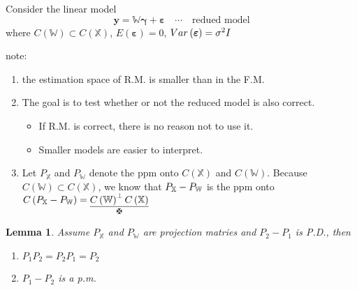 \documentclass{article}
\newtheorem{lemma}[theorem]{Lemma}
\begin{document}
\bigskip

Consider the linear model%
\begin{equation*}
\boldsymbol{y}=\mathbb{W}\boldsymbol{\gamma }+\boldsymbol{\varepsilon \quad }%
\cdots \boldsymbol{\quad }\text{redued model}
\end{equation*}%
where $C\left( \mathbb{W}\right) \subset C\left( \mathbb{X}\right) $, $%
E\left( \boldsymbol{\varepsilon }\right) =0$, $Var\left( \boldsymbol{%
\varepsilon }\right) =\sigma ^{2}I$

\bigskip

note:

\begin{enumerate}
\item the estimation space of R.M. is smaller than in the F.M.

\item The goal is to test whether or not the reduced model is also correct.

\begin{itemize}
\item If R.M. is correct, there is no reason not to use it.

\item Smaller models are easier to interpret.
\end{itemize}

\item Let $P_{\mathbb{X}}$ and $P_{\mathbb{W}}$ denote the ppm onto $C\left( 
\mathbb{X}\right) $ and $C\left( \mathbb{W}\right) $. Because $C\left( 
\mathbb{W}\right) \subset C\left( \mathbb{X}\right) $, we know that $P_{%
\mathbb{X}}-P_{\mathbb{W}}$ is the ppm onto $C\left( P_{\mathbb{X}}-P_{%
\mathbb{W}}\right) =\underset{\maltese }{\underline{C\left( \mathbb{W}%
\right) ^{\perp }C\left( \mathbb{X}\right) }}$
\end{enumerate}

\bigskip

\begin{lemma}
Assume $P_{\mathbb{X}}$ and $P_{\mathbb{W}}$ are projection matries and $%
P_{2}-P_{1}$ is P.D., then

\begin{enumerate}
\item $P_{1}P_{2}=P_{2}P_{1}=P_{2}$

\item $P_{1}-P_{2}$ is a p.m.
\end{enumerate}
\end{lemma}

\bigskip
\end{document}

